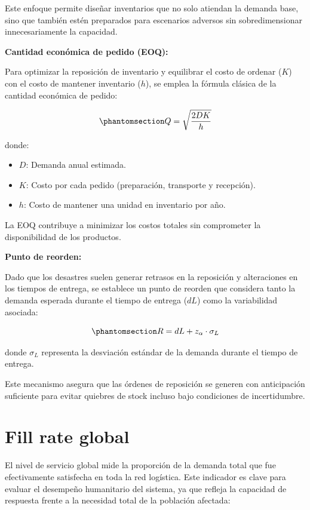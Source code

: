 \documentclass[
  spanish,
  us-letterpaper,
]{scrreprt}
\providecommand{\tightlist}{%
  \setlength{\itemsep}{0pt}\setlength{\parskip}{0pt}}
\numberwithin{equation}{section}
\begin{document}
Este enfoque permite diseñar inventarios que no solo atiendan la demanda
base, sino que también estén preparados para escenarios adversos sin
sobredimensionar innecesariamente la capacidad.

\textbf{Cantidad económica de pedido (EOQ):}

Para optimizar la reposición de inventario y equilibrar el costo de
ordenar (\(K\)) con el costo de mantener inventario (\(h\)), se emplea
la fórmula clásica de la cantidad económica de pedido:

\begin{equation}\phantomsection\label{eq-EOQ}{
Q = \sqrt{\frac{2DK}{h}} 
}\end{equation}

donde:

\begin{itemize}
\tightlist
\item
  \(D\): Demanda anual estimada.
\item
  \(K\): Costo por cada pedido (preparación, transporte y recepción).
\item
  \(h\): Costo de mantener una unidad en inventario por año.
\end{itemize}

La EOQ contribuye a minimizar los costos totales sin comprometer la
disponibilidad de los productos.

\textbf{Punto de reorden:}

Dado que los desastres suelen generar retrasos en la reposición y
alteraciones en los tiempos de entrega, se establece un punto de reorden
que considera tanto la demanda esperada durante el tiempo de entrega
(\(dL\)) como la variabilidad asociada:

\begin{equation}\phantomsection\label{eq-pr}{
R = dL + z_{\alpha} \cdot \sigma_L 
}\end{equation}

donde \(\sigma_L\) representa la desviación estándar de la demanda
durante el tiempo de entrega.

Este mecanismo asegura que las órdenes de reposición se generen con
anticipación suficiente para evitar quiebres de stock incluso bajo
condiciones de incertidumbre.

\section{Fill rate global}\label{fill-rate-global}

El nivel de servicio global mide la proporción de la demanda total que
fue efectivamente satisfecha en toda la red logística. Este indicador es
clave para evaluar el desempeño humanitario del sistema, ya que refleja
la capacidad de respuesta frente a la necesidad total de la población
afectada:
\end{document}
